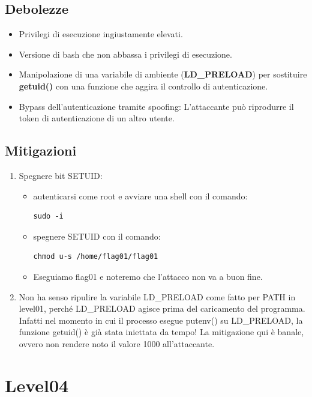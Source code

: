 \subsection{Debolezze}
\begin{itemize}
    \item Privilegi di esecuzione ingiustamente elevati.
    \item Versione di bash che non abbassa i privilegi di esecuzione.
    \item Manipolazione di una variabile di ambiente (\textbf{LD\_PRELOAD}) per sostituire \textbf{getuid()} con una funzione che aggira il controllo di autenticazione.
    \item Bypass dell'autenticazione tramite spoofing: L'attaccante può riprodurre il token di autenticazione di un altro utente.
\end{itemize}
\subsection{Mitigazioni}
\begin{enumerate}
    \item Spegnere bit SETUID:
    \begin{itemize}
        \item autenticarsi come root e avviare una shell con il comando: \begin{lstlisting}[style=bashstyle] 
        sudo -i
        \end{lstlisting}
        \item spegnere SETUID con il comando: \begin{lstlisting}[style=bashstyle] 
        chmod u-s /home/flag01/flag01
        \end{lstlisting}   
        \item Eseguiamo flag01 e noteremo che l’attacco non va a buon fine. 
    \end{itemize}
    \item Non ha senso ripulire la variabile LD\_PRELOAD come fatto per PATH in level01, perché LD\_PRELOAD agisce prima del caricamento del programma. Infatti nel momento in cui il processo esegue putenv() su LD\_PRELOAD, la funzione getuid() è già stata iniettata da tempo!
    La mitigazione qui è banale, ovvero non rendere noto il valore 1000 all'attaccante.
\end{enumerate}

\section{Level04}
